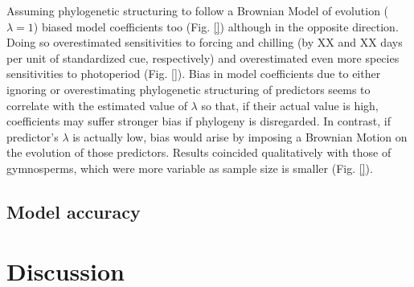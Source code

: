 \documentclass{article}\usepackage[]{graphicx}\usepackage[]{color}
\begin{document}
Assuming phylogenetic structuring to follow a Brownian Model of evolution ($\lambda = 1$) biased model coefficients too (Fig. \ref{}) although in the opposite direction. Doing so overestimated sensitivities to forcing and chilling (by XX and XX days per unit of standardized cue, respectively) and overestimated even more species sensitivities to photoperiod (Fig. \ref{}). Bias in model coefficients due to either ignoring or overestimating phylogenetic structuring of predictors seems to correlate with the estimated value of $\lambda$ so that, if their actual value is high, coefficients may suffer stronger bias if phylogeny is disregarded. In contrast, if predictor's $\lambda$ is actually low, bias would arise by imposing a Brownian Motion on the evolution of those predictors. Results coincided qualitatively with those of gymnosperms, which were more variable as sample size is smaller (Fig. \ref{}).\\



\subsection*{Model accuracy}








\section*{Discussion}
\end{document}
